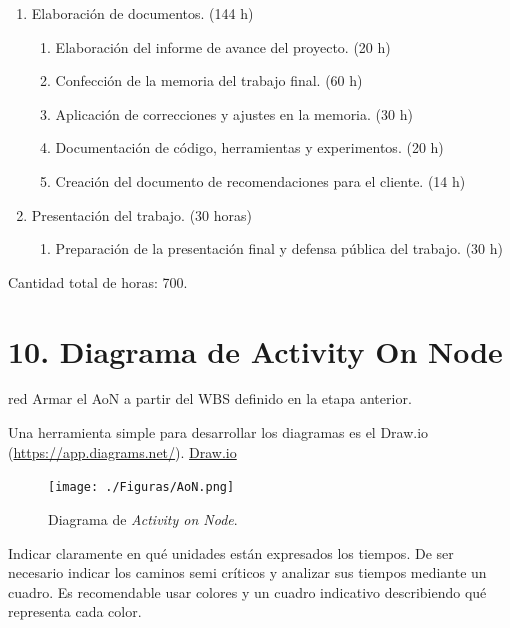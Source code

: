 \documentclass[
11pt, %
]{charter}
\begin{document}
\begin{enumerate}
	\item Elaboración de documentos. (144 h)
	\begin{enumerate}
		\item Elaboración del informe de avance del proyecto. (20 h)
		\item Confección de la memoria del trabajo final. (60 h)
		\item Aplicación de correcciones y ajustes en la memoria. (30 h)
		\item Documentación de código, herramientas y experimentos. (20 h)
		\item Creación del documento de recomendaciones para el cliente. (14 h)
	\end{enumerate}
	
	\item Presentación del trabajo. (30 horas)
	\begin{enumerate}
		\item Preparación de la presentación final y defensa pública del trabajo. (30 h)

	\end{enumerate}
	
\end{enumerate}

Cantidad total de horas: 700.


\section{10. Diagrama de Activity On Node}
\label{sec:AoN}

\begin{consigna}{red}
Armar el AoN a partir del WBS definido en la etapa anterior.

Una herramienta simple para desarrollar los diagramas es el Draw.io (\url{https://app.diagrams.net/}).
\href{https://app.diagrams.net}{Draw.io}


\begin{figure}[htpb]
\centering 
\texttt{[image: ./Figuras/AoN.png]}
\caption{Diagrama de \textit{Activity on Node}.}
\label{fig:AoN}
\end{figure}

Indicar claramente en qué unidades están expresados los tiempos.
De ser necesario indicar los caminos semi críticos y analizar sus tiempos mediante un cuadro.
Es recomendable usar colores y un cuadro indicativo describiendo qué representa cada color.

\end{consigna}
\end{document}
